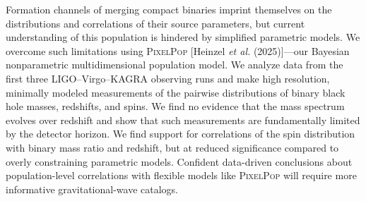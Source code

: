 \label{chapter: pixelpop gwtc3}
\begin{refsection}
\begin{chapterabstract}
Formation channels of merging compact binaries imprint themselves on the distributions and correlations of their source parameters, but current understanding of this population is hindered by simplified parametric models. We overcome such limitations using \textsc{PixelPop} [Heinzel \textit{et al.} (2025)]---our Bayesian nonparametric multidimensional population model. We analyze data from the first three LIGO--Virgo--KAGRA observing runs and make high resolution, minimally modeled measurements of the pairwise distributions of binary black hole masses, redshifts, and spins. We find no evidence that the mass spectrum evolves over redshift and show that such measurements are fundamentally limited by the detector horizon. We find support for correlations of the spin distribution with binary mass ratio and redshift, but at reduced significance compared to overly constraining parametric models. Confident data-driven conclusions about population-level correlations with flexible models like \textsc{PixelPop} will require more informative gravitational-wave catalogs.
\end{chapterabstract}


\end{refsection}
